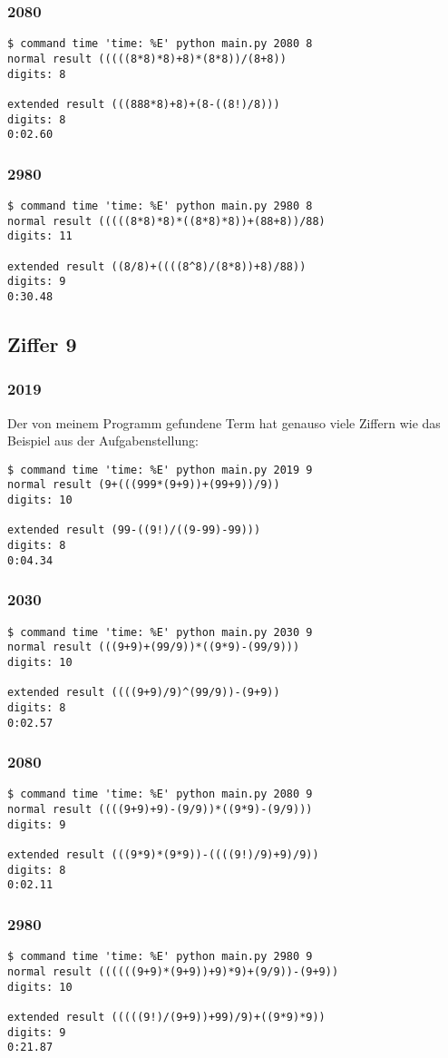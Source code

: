 \subsubsection{2080}
\begin{lstlisting}
$ command time 'time: %E' python main.py 2080 8
normal result (((((8*8)*8)+8)*(8*8))/(8+8))
digits: 8

extended result (((888*8)+8)+(8-((8!)/8)))
digits: 8
0:02.60
\end{lstlisting}
\subsubsection{2980}
\begin{lstlisting}
$ command time 'time: %E' python main.py 2980 8
normal result (((((8*8)*8)*((8*8)*8))+(88+8))/88)
digits: 11

extended result ((8/8)+((((8^8)/(8*8))+8)/88))
digits: 9
0:30.48
\end{lstlisting}
\subsection{Ziffer 9}
\subsubsection{2019}
Der von meinem Programm gefundene Term hat genauso viele Ziffern wie das Beispiel aus der Aufgabenstellung:
\begin{lstlisting}
$ command time 'time: %E' python main.py 2019 9
normal result (9+(((999*(9+9))+(99+9))/9))
digits: 10

extended result (99-((9!)/((9-99)-99)))
digits: 8
0:04.34
\end{lstlisting}
\subsubsection{2030}
\begin{lstlisting}
$ command time 'time: %E' python main.py 2030 9
normal result (((9+9)+(99/9))*((9*9)-(99/9)))
digits: 10

extended result ((((9+9)/9)^(99/9))-(9+9))
digits: 8
0:02.57
\end{lstlisting}
\subsubsection{2080}
\begin{lstlisting}
$ command time 'time: %E' python main.py 2080 9
normal result ((((9+9)+9)-(9/9))*((9*9)-(9/9)))
digits: 9

extended result (((9*9)*(9*9))-((((9!)/9)+9)/9))
digits: 8
0:02.11
\end{lstlisting}
\subsubsection{2980}
\begin{lstlisting}
$ command time 'time: %E' python main.py 2980 9
normal result ((((((9+9)*(9+9))+9)*9)+(9/9))-(9+9))
digits: 10

extended result (((((9!)/(9+9))+99)/9)+((9*9)*9))
digits: 9
0:21.87
\end{lstlisting}
